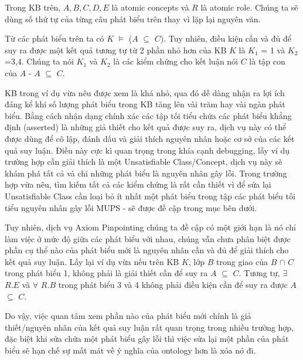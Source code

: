 Trong KB trên, $A, B, C, D, E$ là atomic concepts và $R$ là atomic role.  Chúng ta sẽ dùng số thứ tự của từng câu phát biểu trên thay vì lặp lại nguyên văn.

\hspace*{0.05\textwidth} Từ các phát biểu trên ta có $K$ $\models$ ($A$ $\subseteq$ $C$). Tuy nhiên, điều kiện cần và đủ để suy ra được một kết quả tương tự từ 2 phần nhỏ hơn của KB $K$ là $K_{1}$ = {1} và $K_{2}$ ={3,4}. Chúng ta nói $K_{1}$ và $K_{2}$ là các kiểm chứng cho kết luận nói $C$ là tập con của $A$ - $A$ $\subseteq$ $C$.

\hspace*{0.05\textwidth} KB trong ví dụ vừa nêu được xem là khá nhỏ, qua đó dễ dàng nhận ra lợi ích đáng kể khi số lượng phát biểu trong KB tăng lên vài trăm hay vài ngàn phát biểu. Bằng cách nhận dạng chính xác các tập tối tiểu chứa các phát biểu khẳng định (asserted) là những giả thiết cho kết quả được suy ra, dịch vụ này có thể được dùng để cô lập, đánh dấu và giải thích nguyên nhân hoặc cơ sở của các kết quả suy luận. Điều này cực kì quan trọng trong khía cạnh debugging, lấy ví dụ trường hợp cần giải thích là một Unsatisfiable Class/Concept, dịch vụ này sẽ khám phá tất cả và chỉ những phát biểu là nguyên nhân gây lỗi. Trong trường hợp vừa nêu, tìm kiếm tất cả các kiểm chứng là rất cần thiết vì để sửa lại Unsatisfiable Class cần loại bỏ ít nhất một phát biểu trong tập các phát biểu tối tiểu nguyên nhân gây lỗi MUPS - sẽ được đề cập trong mục bên dưới.

\hspace*{0.05\textwidth} Tuy nhiên, dịch vụ Axiom Pinpointing chúng ta đề cập có một giới hạn là nó chỉ làm việc ở mức độ giữa các phát biểu với nhau, chúng vẫn chưa phân biệt được phần cụ thể nào của phát biểu mới là nguyên nhân cần và đủ để giải thích cho kết quả suy luận. Lấy lại ví dụ vừa nếu trên KB $K$, lớp $B$ trong giao của $B$ $\cap$ $C$ trong phát biểu 1, không phải là giải thiết cần để suy ra $A$ $\subseteq$ $C$. Tương tự, $\exists$ $R.E$ và $\forall$ $R.B$ trong phát biểu 3 và 4 không phải điều kiện cần để suy ra được $A$ $\subseteq$ $C$. 

\hspace{0.05\textwidth} Do vậy, việc quan tâm xem phần nào của phát biểu mới chính là giả thiết/nguyên nhân của kết quả suy luận rất quan trọng trong nhiều trường hợp, đặc biệt khi sửa chữa một phát biểu gây lỗi thì việc sửa lại một phần của phát biểu sẽ hạn chế sự mất mát về ý nghĩa của ontology hơn là xóa nó đi.

